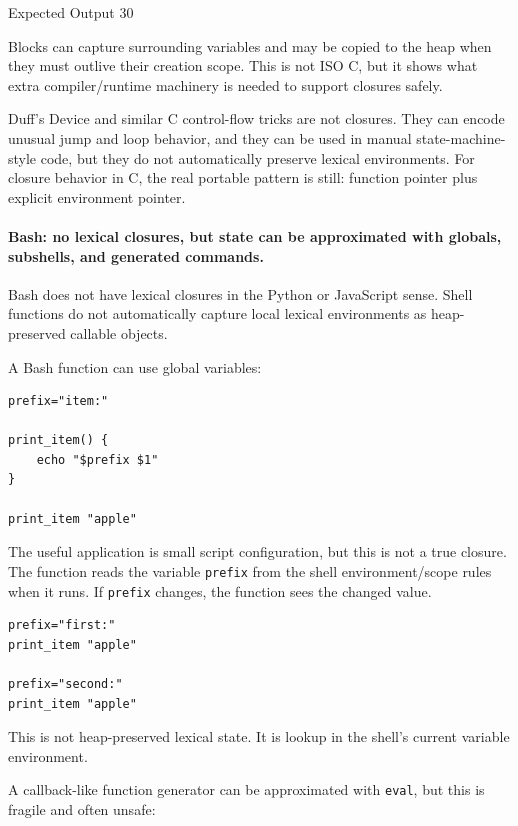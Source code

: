 \documentclass[a4paper,twoside]{report}
\begin{document}
\begin{iobox}{Expected Output}
30 \\
\end{iobox}



Blocks can capture surrounding variables and may be copied to the heap when they must outlive their creation scope. This is not ISO C, but it shows what extra compiler/runtime machinery is needed to support closures safely.

Duff's Device and similar C control-flow tricks are not closures. They can encode unusual jump and loop behavior, and they can be used in manual state-machine-style code, but they do not automatically preserve lexical environments. For closure behavior in C, the real portable pattern is still: function pointer plus explicit environment pointer.

\paragraph{Bash: no lexical closures, but state can be approximated with globals, subshells, and generated commands.}

Bash does not have lexical closures in the Python or JavaScript sense. Shell functions do not automatically capture local lexical environments as heap-preserved callable objects.

A Bash function can use global variables:

\begin{verbatim}
prefix="item:"

print_item() {
    echo "$prefix $1"
}

print_item "apple"
\end{verbatim}

The useful application is small script configuration, but this is not a true closure. The function reads the variable \texttt{prefix} from the shell environment/scope rules when it runs. If \texttt{prefix} changes, the function sees the changed value.

\begin{verbatim}
prefix="first:"
print_item "apple"

prefix="second:"
print_item "apple"
\end{verbatim}

This is not heap-preserved lexical state. It is lookup in the shell's current variable environment.

A callback-like function generator can be approximated with \texttt{eval}, but this is fragile and often unsafe:
\end{document}
